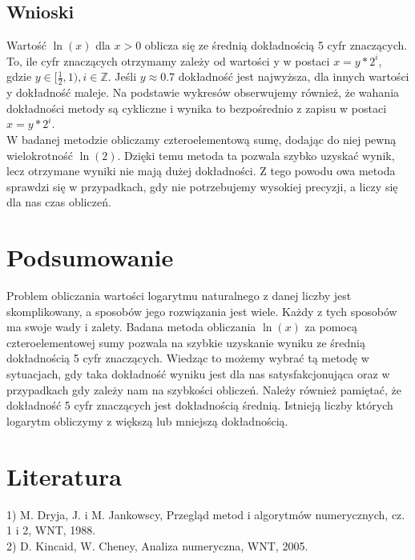 \documentclass[10pt]{article}
\begin{document}
\subsection{Wnioski}
Wartość $\ln(x)$ dla $x>0$ oblicza się ze średnią dokładnością 5 cyfr znaczących. To, ile cyfr znaczących otrzymamy zależy od wartości y w postaci $x = y * 2^{i}$, gdzie $y \in [\frac{1}{2},1), i \in \mathbb{Z}$. Jeśli $y \approx 0.7$ dokładność jest najwyższa, dla innych wartości y dokładność maleje. Na podstawie wykresów obserwujemy również, że wahania dokładności metody są cykliczne i wynika to bezpośrednio z zapisu w postaci $x = y * 2^{i}$.\\
W badanej metodzie obliczamy cztero­elementową sumę, dodając do niej pewną wielokrotność $\ln(2)$. Dzięki temu metoda ta pozwala szybko uzyskać wynik, lecz otrzymane wyniki nie mają dużej dokładności. Z tego powodu owa metoda sprawdzi się w przypadkach, gdy nie potrzebujemy wysokiej precyzji, a liczy się dla nas czas obliczeń.


\section{Podsumowanie}
Problem obliczania wartości logarytmu naturalnego z danej liczby jest skomplikowany, a sposobów jego rozwiązania jest wiele. Każdy z tych sposobów ma swoje wady i zalety. Badana metoda obliczania $\ln(x)$ za pomocą czteroelementowej sumy pozwala na szybkie uzyskanie wyniku ze średnią dokładnością 5 cyfr znaczących. Wiedząc to możemy wybrać tą metodę w sytuacjach, gdy taka dokładność wyniku jest dla nas satysfakcjonująca oraz w przypadkach gdy zależy nam na szybkości obliczeń. Należy również pamiętać, że dokładność 5 cyfr znaczących jest dokładnością średnią. Istnieją liczby których logarytm obliczymy z większą lub mniejszą dokładnością. 

\section{Literatura}

1) M. Dryja, J. i M. Jankowscy, Przegląd metod i algorytmów numerycznych, cz. 1 i 2, WNT, 1988.\\
2) D. Kincaid, W. Cheney, Analiza numeryczna, WNT, 2005.\\
\end{document}
